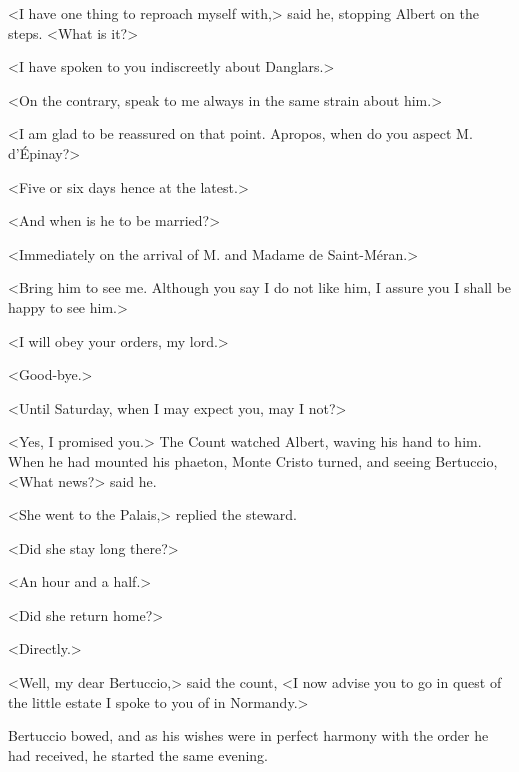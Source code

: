  <I have one thing to reproach myself with,> said he, stopping Albert on the steps. <What is it?> 

 <I have spoken to you indiscreetly about Danglars.> 

 <On the contrary, speak to me always in the same strain about him.> 

 <I am glad to be reassured on that point. Apropos, when do you aspect M. d'Épinay?> 

 <Five or six days hence at the latest.> 

 <And when is he to be married?> 

 <Immediately on the arrival of M. and Madame de Saint-Méran.> 

 <Bring him to see me. Although you say I do not like him, I assure you I shall be happy to see him.> 

 <I will obey your orders, my lord.> 

 <Good-bye.> 

 <Until Saturday, when I may expect you, may I not?> 

 <Yes, I promised you.> The Count watched Albert, waving his hand to him. When he had mounted his phaeton, Monte Cristo turned, and seeing Bertuccio, <What news?> said he. 

 <She went to the Palais,> replied the steward. 

 <Did she stay long there?> 

 <An hour and a half.> 

 <Did she return home?> 

 <Directly.> 

 <Well, my dear Bertuccio,> said the count, <I now advise you to go in quest of the little estate I spoke to you of in Normandy.> 

 Bertuccio bowed, and as his wishes were in perfect harmony with the order he had received, he started the same evening. 